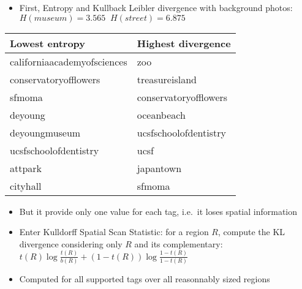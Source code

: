 \begin{frame}

\begin{itemize}
\itemsep1pt\parskip0pt
\item
  First, Entropy and Kullback Leibler divergence with background photos:
  $ H(museum)=3.565\;\; H(street)=6.875$
\end{itemize}

\begin{center}
\begin{tabular}{ll}
\toprule\addlinespace
Lowest entropy & Highest divergence
\\
\midrule
californiaacademyofsciences & zoo
\\
conservatoryofflowers & treasureisland
\\
sfmoma & conservatoryofflowers
\\
deyoung & oceanbeach
\\
deyoungmuseum & ucsfschoolofdentistry
\\
ucsfschoolofdentistry & ucsf
\\
attpark & japantown
\\
cityhall & sfmoma
\\
\bottomrule
\end{tabular}
\end{center}

\end{frame}

\begin{frame}

\begin{itemize}
\item
  But it provide only one value for each tag, i.e.~it loses spatial
  information
\item
  Enter Kulldorff Spatial Scan Statistic: for a region $R$, compute the
  KL divergence considering only $R$ and its complementary:
  $t(R)\log \frac{t(R)}{b(R)} + (1-t(R))\log \frac{1-t(R)}{1-t(R)}$
\item
  Computed for all supported tags over all reasonnably sized regions
\end{itemize}

\end{frame}

